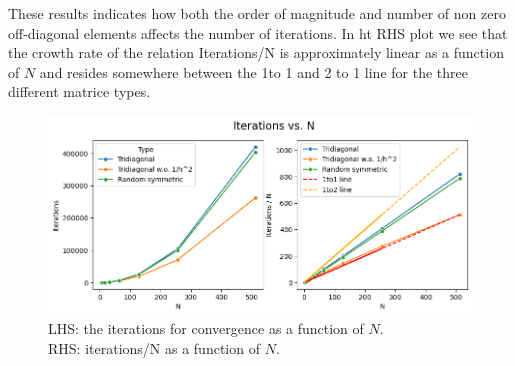 \documentclass[final, 3p, times, 11.5pt]{article}
\begin{document}
These results indicates how both the order of magnitude and number of non zero off-diagonal elements affects the number of iterations. In ht RHS plot we see that the crowth rate of the relation Iterations/N is approximately linear as a function of $N$ and resides somewhere between the 1to 1 and 2 to 1 line for the three different matrice types.
\begin{figure}[h!]
    \centering
    \includegraphics[width=0.7\linewidth]{Project 2/Figures/output.png}
    \caption{LHS: the iterations for convergence as a function of $N$. \\
    RHS: iterations/N as a function of $N$.}
    \label{fig:p2prob5}
\end{figure}
\end{document}

